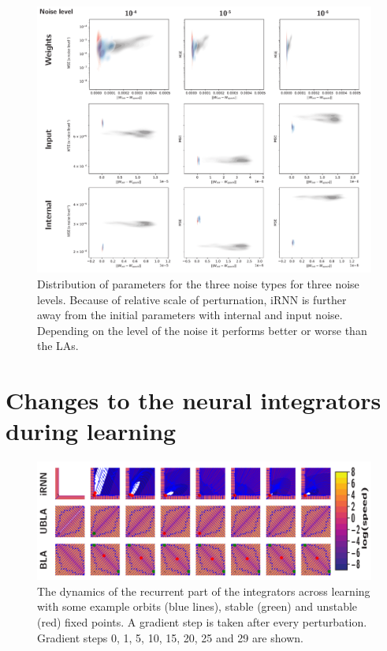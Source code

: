 \documentclass{article} %
\newcounter{ct}
\theoremstyle{definition}
\theoremstyle{remark}
\begin{document}
\begin{figure}[H]
     \centering
    \includegraphics[width=\textwidth]{allnoise_contours}
       \caption{Distribution of parameters for the three noise types for three noise levels. Because of relative scale of perturnation, iRNN is further away from the initial parameters with internal and input noise.
        Depending on the level of the noise it performs better or worse than the LAs.}
         \label{fig:interal_input_contours}
\end{figure}



\section{Changes to the neural integrators during learning}\label{sec:supp:learning}

\begin{figure}[H]
     \centering
    \includegraphics[width=\textwidth]{vfs_f100_gs1_optlrs}
       \caption{The dynamics of the recurrent part of the integrators across learning with some example orbits (blue lines), stable (green) and unstable (red) fixed points. A gradient step is taken after every perturbation. Gradient steps 0, 1, 5, 10, 15, 20, 25 and 29 are shown. }
         \label{fig:vfs1}
\end{figure}
\end{document}
